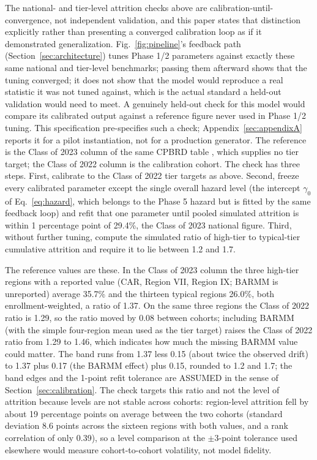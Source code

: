 \documentclass[11pt]{article}
\begin{document}
The national- and tier-level attrition checks above are calibration-until-convergence, not independent validation, and this paper states that distinction explicitly rather than presenting a converged calibration loop as if it demonstrated generalization. Fig.~\ref{fig:pipeline}'s feedback path (Section~\ref{sec:architecture}) tunes Phase 1/2 parameters against exactly these same national and tier-level benchmarks; passing them afterward shows that the tuning converged; it does not show that the model would reproduce a real statistic it was not tuned against, which is the actual standard a held-out validation would need to meet. A genuinely held-out check for this model would compare its calibrated output against a reference figure never used in Phase 1/2 tuning. This specification pre-specifies such a check; Appendix~\ref{sec:appendixA} reports it for a pilot instantiation, not for a production generator. The reference is the Class of 2023 column of the same CPBRD table \citep{cpbrd2026}, which supplies no tier target; the Class of 2022 column is the calibration cohort. The check has three steps. First, calibrate to the Class of 2022 tier targets as above. Second, freeze every calibrated parameter except the single overall hazard level (the intercept $\gamma_0$ of Eq.~\ref{eq:hazard}, which belongs to the Phase 5 hazard but is fitted by the same feedback loop) and refit that one parameter until pooled simulated attrition is within 1 percentage point of 29.4\%, the Class of 2023 national figure. Third, without further tuning, compute the simulated ratio of high-tier to typical-tier cumulative attrition and require it to lie between 1.2 and 1.7.

The reference values are these. In the Class of 2023 column the three high-tier regions with a reported value (CAR, Region VII, Region IX; BARMM is unreported) average 35.7\% and the thirteen typical regions 26.0\%, both enrollment-weighted, a ratio of 1.37. On the same three regions the Class of 2022 ratio is 1.29, so the ratio moved by 0.08 between cohorts; including BARMM (with the simple four-region mean used as the tier target) raises the Class of 2022 ratio from 1.29 to 1.46, which indicates how much the missing BARMM value could matter. The band runs from 1.37 less 0.15 (about twice the observed drift) to 1.37 plus 0.17 (the BARMM effect) plus 0.15, rounded to 1.2 and 1.7; the band edges and the 1-point refit tolerance are ASSUMED in the sense of Section~\ref{sec:calibration}. The check targets this ratio and not the level of attrition because levels are not stable across cohorts: region-level attrition fell by about 19 percentage points on average between the two cohorts (standard deviation 8.6 points across the sixteen regions with both values, and a rank correlation of only 0.39), so a level comparison at the $\pm$3-point tolerance used elsewhere would measure cohort-to-cohort volatility, not model fidelity.
\end{document}
